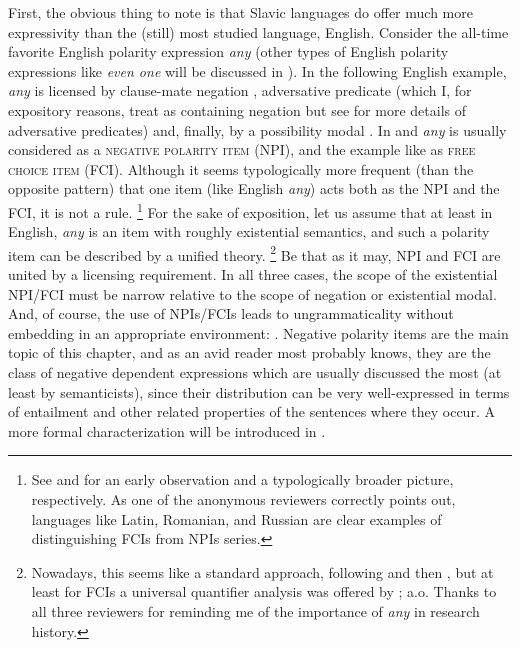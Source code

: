 \documentclass[output=paper,colorlinks,citecolor=brown]{langscibook}
\begin{document}
First, the obvious thing to note is that Slavic languages do offer much more expressivity than the (still) most studied language, English. Consider the all-time favorite English polarity expression \emph{any} (other types of English polarity expressions like \emph{even one} will be discussed in ). In the following English example, \emph{any} is licensed by clause-mate negation , adversative predicate  (which I, for expository reasons, treat as containing negation but see  for more details of adversative predicates) and, finally, by a possibility modal . In  and  \textit{any} is usually considered as a \textsc{negative polarity item} (NPI), and the example like  as \textsc{free choice item} (FCI). Although it seems typologically more frequent (than the opposite pattern) that one item (like English \textit{any}) acts both as the NPI and the FCI, it is not a rule.%
\footnote{See \citet{horn1972semantic} and 
\citet{Haspelmath1997} for an early observation and a typologically broader picture, respectively. As one of the anonymous reviewers correctly points out, languages like Latin, Romanian, and Russian are clear examples of distinguishing FCIs from NPIs series.}
For the sake of exposition, let us assume that at least in English, \textit{any} is an item with roughly existential semantics, and such a polarity item can be described by a unified theory.%
\footnote{Nowadays, this seems like a standard approach, following \citet{carlson1980polarity} and then \citet{kadmon1993any}, but at least for FCIs a universal quantifier analysis was offered by \citet{dayal1998any}; a.o. Thanks to all three reviewers for reminding me of the importance of \textit{any} in research history.}
Be that as it may, NPI and FCI are united by a licensing requirement. In all three cases, the scope of the existential NPI/FCI must be narrow relative to the scope of negation or existential modal. And, of course, the use of NPIs/FCIs leads to ungrammaticality without embedding in an appropriate environment: . Negative polarity items are the main topic of this chapter, and as an avid reader most probably knows, they are the class of negative dependent expressions which are usually discussed the most (at least by semanticists), since their distribution can be very well-expressed in terms of entailment and other related properties of the sentences where they occur. A more formal characterization will be introduced in .
\end{document}
